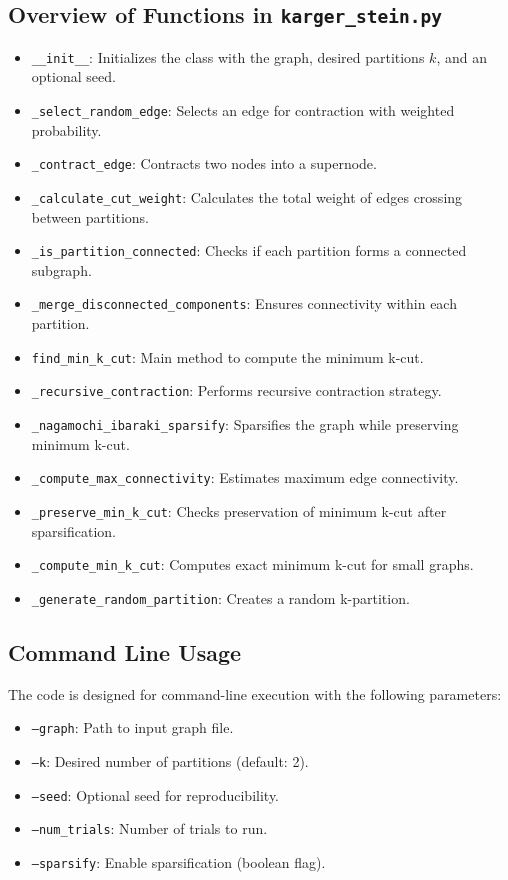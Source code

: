 \documentclass[11pt]{article}
\begin{document}
\subsection{Overview of Functions in \texttt{karger\_stein.py}}
\begin{itemize}
    \item \texttt{\_\_init\_\_}: Initializes the class with the graph, desired partitions \( k \), and an optional seed.
    \item \texttt{\_select\_random\_edge}: Selects an edge for contraction with weighted probability.
    \item \texttt{\_contract\_edge}: Contracts two nodes into a supernode.
    \item \texttt{\_calculate\_cut\_weight}: Calculates the total weight of edges crossing between partitions.
    \item \texttt{\_is\_partition\_connected}: Checks if each partition forms a connected subgraph.
    \item \texttt{\_merge\_disconnected\_components}: Ensures connectivity within each partition.
    \item \texttt{find\_min\_k\_cut}: Main method to compute the minimum k-cut.
    \item \texttt{\_recursive\_contraction}: Performs recursive contraction strategy.
    \item \texttt{\_nagamochi\_ibaraki\_sparsify}: Sparsifies the graph while preserving minimum k-cut.
    \item \texttt{\_compute\_max\_connectivity}: Estimates maximum edge connectivity.
    \item \texttt{\_preserve\_min\_k\_cut}: Checks preservation of minimum k-cut after sparsification.
    \item \texttt{\_compute\_min\_k\_cut}: Computes exact minimum k-cut for small graphs.
    \item \texttt{\_generate\_random\_partition}: Creates a random k-partition.
\end{itemize}

\subsection{Command Line Usage}
The code is designed for command-line execution with the following parameters:
\begin{itemize}
    \item \texttt{--graph}: Path to input graph file.
    \item \texttt{--k}: Desired number of partitions (default: 2).
    \item \texttt{--seed}: Optional seed for reproducibility.
    \item \texttt{--num\_trials}: Number of trials to run.
    \item \texttt{--sparsify}: Enable sparsification (boolean flag).
\end{itemize}
\end{document}
